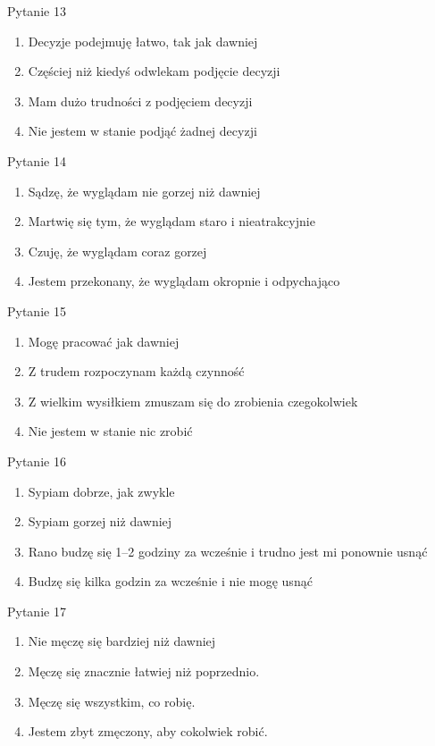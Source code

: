 \documentclass[
  openany]{book}
\providecommand{\tightlist}{%
  \setlength{\itemsep}{0pt}\setlength{\parskip}{0pt}}
\begin{document}
Pytanie 13

\begin{enumerate}
\def\labelenumi{\arabic{enumi}.}
\setcounter{enumi}{-1}
\tightlist
\item
  Decyzje podejmuję łatwo, tak jak dawniej
\item
  Częściej niż kiedyś odwlekam podjęcie decyzji
\item
  Mam dużo trudności z podjęciem decyzji
\item
  Nie jestem w stanie podjąć żadnej decyzji
\end{enumerate}

Pytanie 14

\begin{enumerate}
\def\labelenumi{\arabic{enumi}.}
\setcounter{enumi}{-1}
\tightlist
\item
  Sądzę, że wyglądam nie gorzej niż dawniej
\item
  Martwię się tym, że wyglądam staro i nieatrakcyjnie
\item
  Czuję, że wyglądam coraz gorzej
\item
  Jestem przekonany, że wyglądam okropnie i odpychająco
\end{enumerate}

Pytanie 15

\begin{enumerate}
\def\labelenumi{\arabic{enumi}.}
\setcounter{enumi}{-1}
\tightlist
\item
  Mogę pracować jak dawniej
\item
  Z trudem rozpoczynam każdą czynność
\item
  Z wielkim wysiłkiem zmuszam się do zrobienia czegokolwiek
\item
  Nie jestem w stanie nic zrobić
\end{enumerate}

Pytanie 16

\begin{enumerate}
\def\labelenumi{\arabic{enumi}.}
\setcounter{enumi}{-1}
\tightlist
\item
  Sypiam dobrze, jak zwykle
\item
  Sypiam gorzej niż dawniej
\item
  Rano budzę się 1--2 godziny za wcześnie i trudno jest mi ponownie usnąć
\item
  Budzę się kilka godzin za wcześnie i nie mogę usnąć
\end{enumerate}

Pytanie 17

\begin{enumerate}
\def\labelenumi{\arabic{enumi}.}
\setcounter{enumi}{-1}
\tightlist
\item
  Nie męczę się bardziej niż dawniej
\item
  Męczę się znacznie łatwiej niż poprzednio.
\item
  Męczę się wszystkim, co robię.
\item
  Jestem zbyt zmęczony, aby cokolwiek robić.
\end{enumerate}
\end{document}

